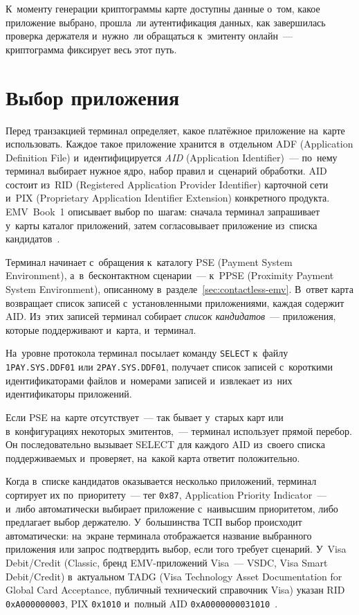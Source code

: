 К~моменту генерации криптограммы карте доступны данные о~том, какое приложение
выбрано, прошла~ли аутентификация данных, как завершилась проверка держателя
и~нужно~ли обращаться к~эмитенту онлайн~--- криптограмма фиксирует весь этот
путь.

\section{Выбор приложения}\label{sec:emv-app-selection}

Перед транзакцией терминал определяет, какое платёжное приложение на~карте
использовать. Каждое такое приложение хранится в~отдельном ADF
(Application Definition File) и~идентифицируется
\textit{AID} (Application Identifier)~--- по~нему терминал
выбирает нужное ядро, набор правил и~сценарий обработки. AID состоит из~RID (Registered Application Provider Identifier) карточной сети и~PIX
(Proprietary Application Identifier Extension) конкретного продукта. EMV~Book~1
описывает выбор по~шагам: сначала терминал запрашивает у~карты каталог
приложений, затем согласовывает приложение из~списка
кандидатов~\cite{emvco-book1}.

Терминал начинает с~обращения к~каталогу PSE (Payment System Environment),
а~в~бесконтактном сценарии~--- к~PPSE (Proximity Payment System Environment),
описанному в~разделе~\ref{sec:contactless-emv}. В~ответ карта возвращает список
записей с~установленными приложениями, каждая содержит AID. Из~этих записей
терминал собирает \emph{список кандидатов}~--- приложения, которые поддерживают
и~карта, и~терминал.

На~уровне протокола терминал посылает команду \texttt{SELECT} к~файлу
\texttt{1PAY.SYS.\allowbreak DDF01} или \texttt{2PAY.SYS.\allowbreak DDF01}, получает список записей
с~короткими идентификаторами файлов и~номерами записей и~извлекает из~них
идентификаторы приложений.

Если PSE на~карте отсутствует~--- так бывает у~старых карт или в~конфигурациях
некоторых эмитентов,~--- терминал использует прямой перебор. Он последовательно
вызывает SELECT для каждого AID из~своего списка поддерживаемых и~проверяет,
на~какой карта ответит положительно.

Когда в~списке кандидатов оказывается несколько приложений, терминал сортирует
их по~приоритету~--- тег \texttt{0x87}, Application Priority Indicator~---
и~либо автоматически выбирает приложение с~наивысшим приоритетом, либо
предлагает выбор держателю. У~большинства ТСП выбор происходит автоматически:
на~экране терминала отображается название выбранного приложения или запрос
подтвердить выбор, если того требует сценарий. У~Visa Debit/Credit
(Classic, бренд EMV-приложений Visa~--- VSDC, Visa Smart Debit/Credit)
в~актуальном TADG (Visa Technology Asset Documentation for Global
Card Acceptance, публичный технический справочник Visa) указан RID
\texttt{0xA000000003}, PIX \texttt{0x1010} и~полный AID
\texttt{0xA0000000031010}~\cite{visa-tadg}.

